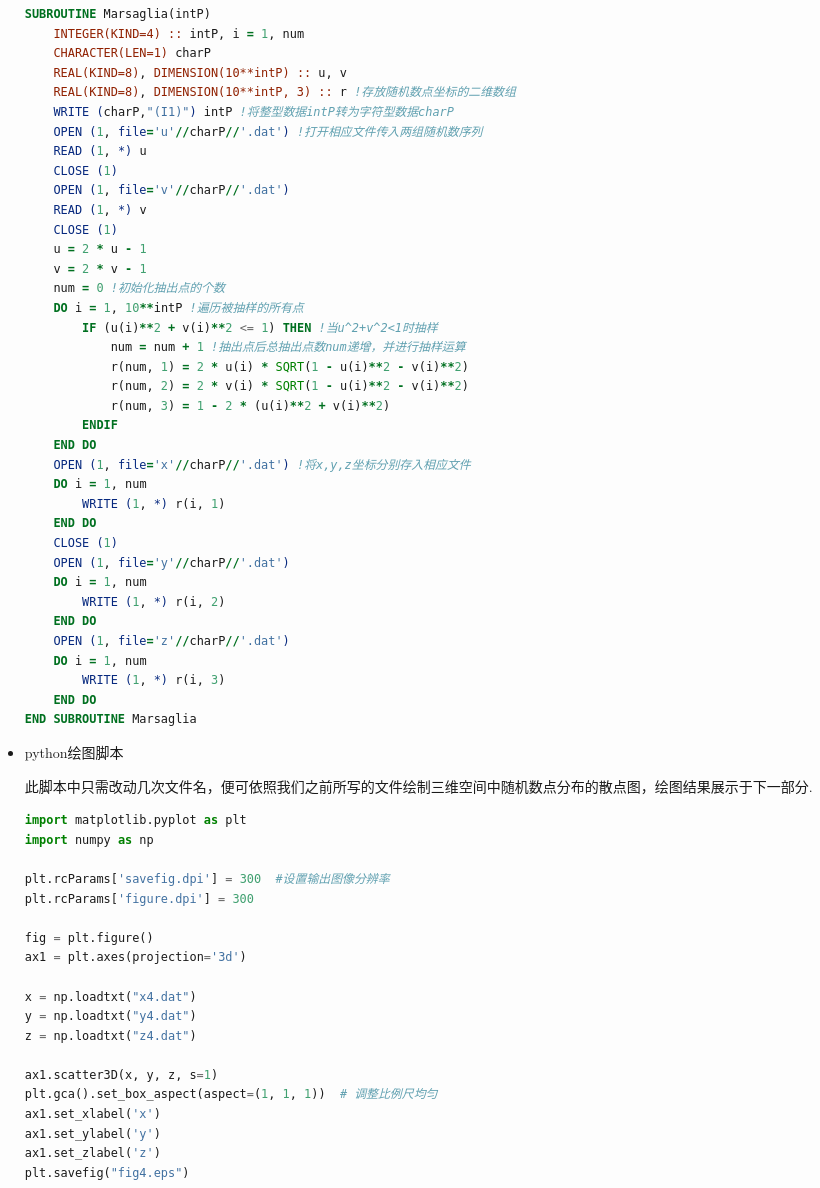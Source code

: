 \documentclass[12pt,a4paper,utf8]{ctexart}
\begin{document}
\begin{itemize}
\begin{framed}
\begin{lstlisting}[language=Fortran]
SUBROUTINE Marsaglia(intP)
    INTEGER(KIND=4) :: intP, i = 1, num
    CHARACTER(LEN=1) charP
    REAL(KIND=8), DIMENSION(10**intP) :: u, v
    REAL(KIND=8), DIMENSION(10**intP, 3) :: r !存放随机数点坐标的二维数组
    WRITE (charP,"(I1)") intP !将整型数据intP转为字符型数据charP
    OPEN (1, file='u'//charP//'.dat') !打开相应文件传入两组随机数序列
    READ (1, *) u
    CLOSE (1)
    OPEN (1, file='v'//charP//'.dat')
    READ (1, *) v
    CLOSE (1)
    u = 2 * u - 1
    v = 2 * v - 1
    num = 0 !初始化抽出点的个数
    DO i = 1, 10**intP !遍历被抽样的所有点
        IF (u(i)**2 + v(i)**2 <= 1) THEN !当u^2+v^2<1时抽样
            num = num + 1 !抽出点后总抽出点数num递增，并进行抽样运算
            r(num, 1) = 2 * u(i) * SQRT(1 - u(i)**2 - v(i)**2)
            r(num, 2) = 2 * v(i) * SQRT(1 - u(i)**2 - v(i)**2)
            r(num, 3) = 1 - 2 * (u(i)**2 + v(i)**2)
        ENDIF
    END DO
    OPEN (1, file='x'//charP//'.dat') !将x,y,z坐标分别存入相应文件
    DO i = 1, num
        WRITE (1, *) r(i, 1)
    END DO
    CLOSE (1)
    OPEN (1, file='y'//charP//'.dat') 
    DO i = 1, num
        WRITE (1, *) r(i, 2)
    END DO
    OPEN (1, file='z'//charP//'.dat') 
    DO i = 1, num
        WRITE (1, *) r(i, 3)
    END DO
END SUBROUTINE Marsaglia
\end{lstlisting}
\end{framed}

\item python绘图脚本

此脚本中只需改动几次文件名，便可依照我们之前所写的文件绘制三维空间中随机数点分布的散点图，绘图结果展示于下一部分.
\begin{framed}
\begin{lstlisting}[language=python]
import matplotlib.pyplot as plt
import numpy as np

plt.rcParams['savefig.dpi'] = 300  #设置输出图像分辨率
plt.rcParams['figure.dpi'] = 300

fig = plt.figure()
ax1 = plt.axes(projection='3d')

x = np.loadtxt("x4.dat")
y = np.loadtxt("y4.dat")
z = np.loadtxt("z4.dat")

ax1.scatter3D(x, y, z, s=1)
plt.gca().set_box_aspect(aspect=(1, 1, 1))  # 调整比例尺均匀
ax1.set_xlabel('x')
ax1.set_ylabel('y')
ax1.set_zlabel('z')
plt.savefig("fig4.eps")
\end{lstlisting}
\end{framed}
\end{itemize}
\end{document}
